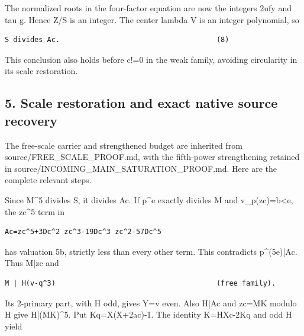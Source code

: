 The normalized roots in the four-factor equation are now the integers 2ufy and tau g. Hence Z/\allowbreak{}S is an integer. The center lambda V is an integer polynomial, so



\begin{verbatim}
S divides Ac.                                     (8)
\end{verbatim}

This conclusion also holds before c!=\allowbreak{}0 in the weak family, avoiding circularity in its scale restoration.



\subsection{5. Scale restoration and exact native source recovery}



The free-scale carrier and strengthened budget are inherited from source/\allowbreak{}FREE\_\allowbreak{}SCALE\_\allowbreak{}PROOF.md, with the fifth-power strengthening retained in source/\allowbreak{}INCOMING\_\allowbreak{}MAIN\_\allowbreak{}SATURATION\_\allowbreak{}PROOF.md. Here are the complete relevant steps.



Since M\textasciicircum{}\allowbreak{}5 divides S, it divides Ac. If p\textasciicircum{}\allowbreak{}e exactly divides M and v\_\allowbreak{}p(zc)=\allowbreak{}b\textless{}\allowbreak{}e, the zc\textasciicircum{}\allowbreak{}5 term in



\begin{verbatim}
Ac=zc^5+3Dc^2 zc^3-19Dc^3 zc^2-57Dc^5
\end{verbatim}

has valuation 5b, strictly less than every other term. This contradicts p\textasciicircum{}\allowbreak{}(5e)|Ac. Thus M|zc and



\begin{verbatim}
M | H(v-q^3)                                      (free family).
\end{verbatim}

Its 2-primary part, with H odd, gives Y=\allowbreak{}v even. Also H|Ac and zc=\allowbreak{}MK modulo H give H|(MK)\textasciicircum{}\allowbreak{}5. Put Kq=\allowbreak{}X(X+\allowbreak{}2ac)-1. The identity K=\allowbreak{}HXc-2Kq and odd H yield



